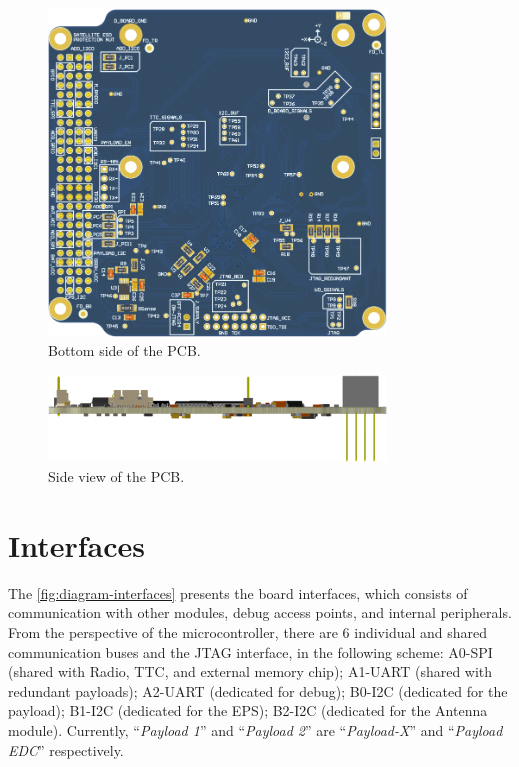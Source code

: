 \begin{figure}[!ht]
    \begin{center}
        \includegraphics[width=0.8\textwidth]{figures/obdh2-pcb-bottom.png}
        \caption{Bottom side of the PCB.}
        \label{fig:pcb-bottom}
    \end{center}
\end{figure}

\begin{figure}[!ht]
    \begin{center}
        \includegraphics[width=0.8\textwidth]{figures/obdh2-pcb-side.png}
        \caption{Side view of the PCB.}
        \label{fig:pcb-side}
    \end{center}
\end{figure}

\section{Interfaces}

The \autoref{fig:diagram-interfaces} presents the board interfaces, which consists of communication with other modules, debug access points, and internal peripherals. From the perspective of the microcontroller, there are 6 individual and shared communication buses and the JTAG interface, in the following scheme: A0-SPI (shared with Radio, TTC, and external memory chip); A1-UART (shared with redundant payloads); A2-UART (dedicated for debug); B0-I2C (dedicated for the payload); B1-I2C (dedicated for the EPS); B2-I2C (dedicated for the Antenna module). Currently, ``\textit{Payload 1}'' and ``\textit{Payload 2}'' are ``\textit{Payload-X}'' and ``\textit{Payload EDC}'' respectively.

